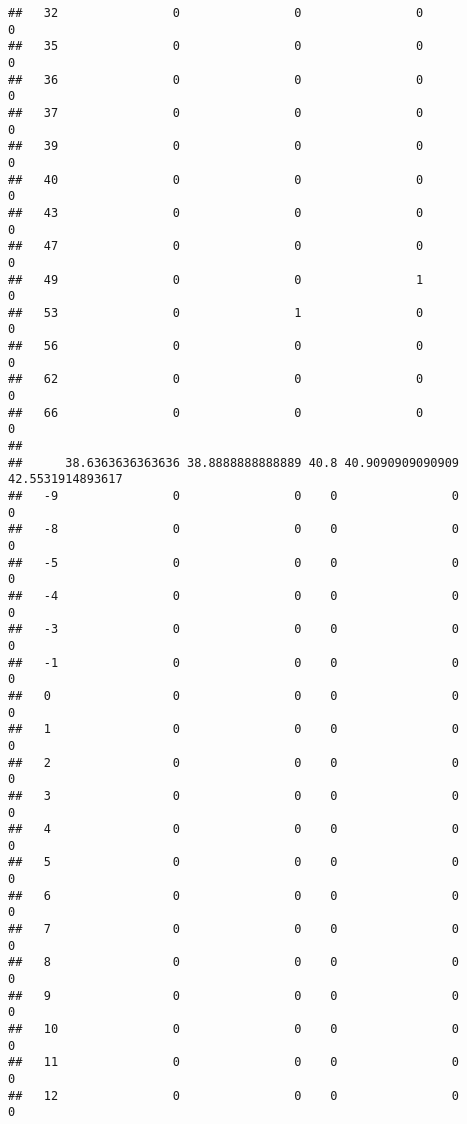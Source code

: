 \documentclass[]{article}
\begin{document}
\begin{verbatim}
##   32                0                0                0                0
##   35                0                0                0                0
##   36                0                0                0                0
##   37                0                0                0                0
##   39                0                0                0                0
##   40                0                0                0                0
##   43                0                0                0                0
##   47                0                0                0                0
##   49                0                0                1                0
##   53                0                1                0                0
##   56                0                0                0                0
##   62                0                0                0                0
##   66                0                0                0                0
##     
##      38.6363636363636 38.8888888888889 40.8 40.9090909090909 42.5531914893617
##   -9                0                0    0                0                0
##   -8                0                0    0                0                0
##   -5                0                0    0                0                0
##   -4                0                0    0                0                0
##   -3                0                0    0                0                0
##   -1                0                0    0                0                0
##   0                 0                0    0                0                0
##   1                 0                0    0                0                0
##   2                 0                0    0                0                0
##   3                 0                0    0                0                0
##   4                 0                0    0                0                0
##   5                 0                0    0                0                0
##   6                 0                0    0                0                0
##   7                 0                0    0                0                0
##   8                 0                0    0                0                0
##   9                 0                0    0                0                0
##   10                0                0    0                0                0
##   11                0                0    0                0                0
##   12                0                0    0                0                0

\end{verbatim}
\end{document}
